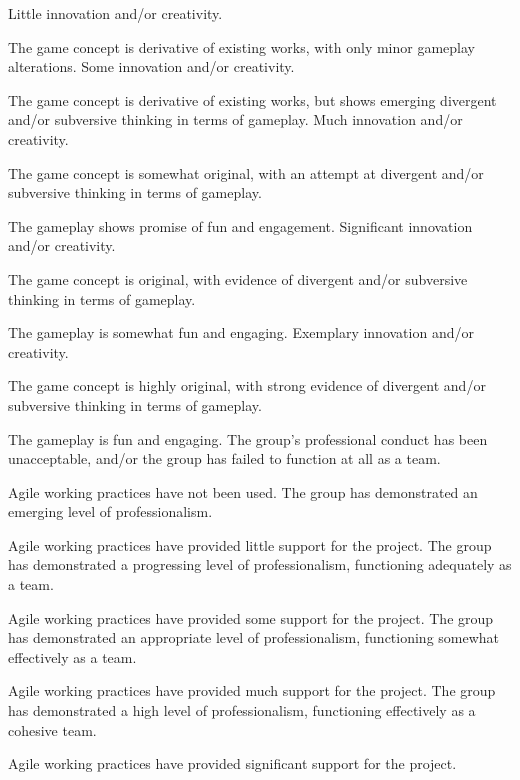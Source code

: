 \documentclass{../fal_assignment}
\begin{document}
\begin{markingrubric}
        \grade Little innovation and/or creativity.
            \par The game concept is derivative of existing works, with only minor gameplay alterations.
        \grade Some innovation and/or creativity.
            \par The game concept is derivative of existing works, but shows emerging divergent and/or subversive thinking in terms of gameplay.
        \grade Much innovation and/or creativity.
            \par The game concept is somewhat original, with an attempt at divergent and/or subversive thinking in terms of gameplay.
            \par The gameplay shows promise of fun and engagement.
        \grade Significant innovation and/or creativity.
            \par The game concept is original, with evidence of divergent and/or subversive thinking in terms of gameplay.
            \par The gameplay is somewhat fun and engaging.
        \grade Exemplary innovation and/or creativity.
            \par The game concept is highly original, with strong evidence of divergent and/or subversive thinking in terms of gameplay.
            \par The gameplay is fun and engaging.
        \grade\fail The group's professional conduct has been unacceptable,
            and/or the group has failed to function at all as a team.
            \par Agile working practices have not been used.
        \grade The group has demonstrated an emerging level of professionalism.
            \par Agile working practices have provided little support for the project.
        \grade The group has demonstrated a progressing level of professionalism,
            functioning adequately as a team.
            \par Agile working practices have provided some support for the project.
        \grade The group has demonstrated an appropriate level of professionalism,
            functioning somewhat effectively as a team.
            \par Agile working practices have provided much support for the project.
        \grade The group has demonstrated a high level of professionalism,
            functioning effectively as a cohesive team.
            \par Agile working practices have provided significant support for the project.

\end{markingrubric}
\end{document}
